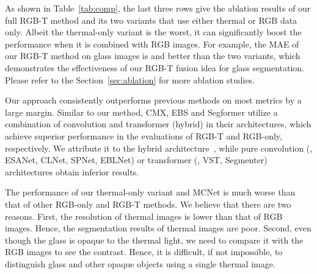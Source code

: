 As shown in Table~\ref{tab:comp}, the last three rows give the ablation results of our full RGB-T method and its two variants that use either thermal or RGB data only. Albeit the thermal-only variant is the worst, it can significantly boost the performance when it is combined with RGB images. For example, the MAE of our RGB-T method on glass images is  and  better than the two variants, which demonstrates the effectiveness of  our RGB-T fusion idea for glass segmentation. Please refer to the Section~\ref{sec:ablation} for more ablation studies.

Our approach consistently outperforms previous methods on most metrics by a large margin. Similar to our method, CMX, EBS and Segformer utilize a combination of convolution and transformer (hybrid) in their architectures, which achieve superior performance in the evaluations of RGB-T and RGB-only, respectively. We attribute it to the hybrid architecture~\cite{carion2020end, xu2021line}, while pure convolution (\eg, ESANet, CLNet, SPNet, EBLNet) or transformer (\eg, VST, Segmenter) architectures obtain inferior results. 

The performance of our thermal-only variant and MCNet is much worse than that of other RGB-only and RGB-T methods. We believe that there are two reasons. First, the resolution of thermal images is lower than that of RGB images. Hence, the segmentation results of thermal images are poor. Second, even though the glass is opaque to the thermal light, we need to compare it with the RGB images to see the contrast. Hence, it is difficult, if not impossible, to distinguish glass and other opaque objects using a single thermal image. 




